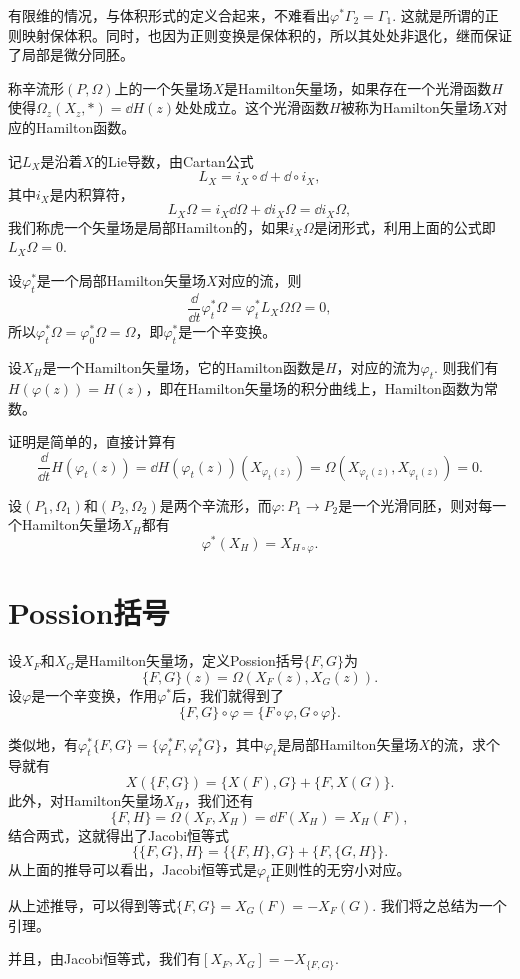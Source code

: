 有限维的情况，与体积形式的定义合起来，不难看出$\varphi^*\Gamma_2=\Gamma_1$. 这就是所谓的正则映射保体积。同时，也因为正则变换是保体积的，所以其处处非退化，继而保证了局部是微分同胚。

\begin{para}[Hamilton矢量场]
称辛流形$(P,\Omega)$上的一个矢量场$X$是Hamilton矢量场，如果存在一个光滑函数$H$使得$\Omega_z(X_z,*)=\dd H(z)$处处成立。这个光滑函数$H$被称为Hamilton矢量场$X$对应的Hamilton函数。
\end{para}

记$L_X$是沿着$X$的Lie导数，由Cartan公式
\[
	L_X=i_X\circ \dd+\dd\circ i_X,
\]
其中$i_X$是内积算符，
\[
	L_X\Omega=i_X\dd \Omega+\dd i_X \Omega=\dd i_X \Omega,
\]
我们称虎一个矢量场是局部Hamilton的，如果$i_X \Omega$是闭形式，利用上面的公式即$L_X\Omega=0$.

设$\varphi_t^*$是一个局部Hamilton矢量场$X$对应的流，则
\[
	\frac{\dd}{\dd t}\varphi_t^* \Omega=\varphi_t^* L_X\Omega \Omega=0,
\]
所以$\varphi_t^* \Omega=\varphi_0^* \Omega=\Omega$，即$\varphi_t^*$是一个辛变换。

\begin{para}[能量守恒]
设$X_H$是一个Hamilton矢量场，它的Hamilton函数是$H$，对应的流为$\varphi_t$. 则我们有$H(\varphi(z))=H(z)$，即在Hamilton矢量场的积分曲线上，Hamilton函数为常数。

证明是简单的，直接计算有
\[
	\frac{\dd}{\dd t}H(\varphi_t(z))=\dd H(\varphi_t(z))(X_{\varphi_t(z)})=\Omega(X_{\varphi_t(z)},X_{\varphi_t(z)})=0.
\]
\end{para}

\begin{lem}
	设$(P_1,\Omega_1)$和$(P_2,\Omega_2)$是两个辛流形，而$\varphi:P_1\to P_2$是一个光滑同胚，则对每一个Hamilton矢量场$X_H$都有
	\[
	\varphi^*(X_H)=X_{H\circ \varphi}.
	\]
\end{lem}

\section{Possion括号}

\begin{para}
设$X_F$和$X_G$是Hamilton矢量场，定义Possion括号$\{F,G\}$为
\[
	\{F,G\}(z)=\Omega(X_F(z),X_G(z)).
\]
设$\varphi$是一个辛变换，作用$\varphi^*$后，我们就得到了
\[
	\{F,G\}\circ \varphi=\{F\circ \varphi,G\circ \varphi\}.
\]

类似地，有$\varphi_t^*\{F,G\}=\{\varphi_t^* F,\varphi_t^* G\}$，其中$\varphi_t$是局部Hamilton矢量场$X$的流，求个导就有
\[
	X(\{F,G\})=\{X(F),G\}+\{F,X(G)\}.
\]
此外，对Hamilton矢量场$X_H$，我们还有
\[
	\{F,H\}=\Omega(X_F,X_H)=\dd F(X_H)=X_H(F),
\]
结合两式，这就得出了Jacobi恒等式
\[
	\{\{F,G\},H\}=\{\{F,H\},G\}+\{F,\{G,H\}\}.
\]
从上面的推导可以看出，Jacobi恒等式是$\varphi_t$正则性的无穷小对应。
\end{para}

\begin{lem}
从上述推导，可以得到等式$\{F,G\}=X_G(F)=-X_F(G)$. 我们将之总结为一个引理。
\end{lem}

并且，由Jacobi恒等式，我们有$[X_F,X_G]=-X_{\{F,G\}}$.